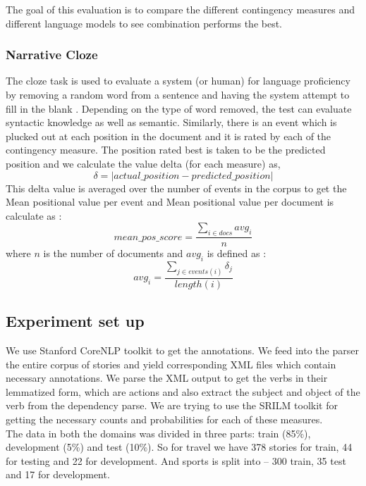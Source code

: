\documentclass[12pt]{article}
\begin{document}
The goal of this evaluation is to compare the different contingency measures and different language models to see combination performs the best.  

\subsubsection{Narrative Cloze}
The cloze task\cite{cloze_proc} is used to evaluate a system (or human) for language proficiency by removing a random word from a sentence and having the system attempt to fill in the blank . Depending on the type of word removed, the test can evaluate syntactic knowledge as well as semantic\cite{nec}. Similarly, there is an event which is plucked out at each position in the document and it is rated by each of the contingency measure. The position rated best is taken to be the predicted position and we calculate the value delta (for each measure) as,
\begin{equation}
\delta = |actual\_position - predicted\_position|
\end{equation}
This delta value is averaged over the number of events in the corpus to get the Mean positional value per event and Mean positional value per document is calculate as :
\begin{equation}
	mean\_pos\_score =\frac{\sum_{i \in docs} avg_i}{n}
\end{equation}
where $n$ is the number of documents and $avg_i$ is defined as :
\begin{equation}
	avg_i  = \frac{\sum_{j \in events(i)} \delta_j}{length(i)}
\end{equation}


\subsection{Experiment set up}
We use Stanford CoreNLP\cite{corenlp} toolkit to get the annotations. We feed into the parser the entire corpus of stories and yield corresponding XML files which contain necessary annotations. We parse the XML output to get the verbs in their lemmatized form, which are actions and also extract the subject and object of the verb from the dependency parse. We are trying to use the SRILM toolkit for getting the necessary counts and probabilities for each of these measures\cite{srilm}. \\
The data in both the domains was divided in three parts:   train (85\%), development (5\%) and test (10\%). So for travel we have 378 stories for train, 44 for testing and 22 for development. And sports is split into – 300 train, 35 test and 17 for development.
\end{document}
